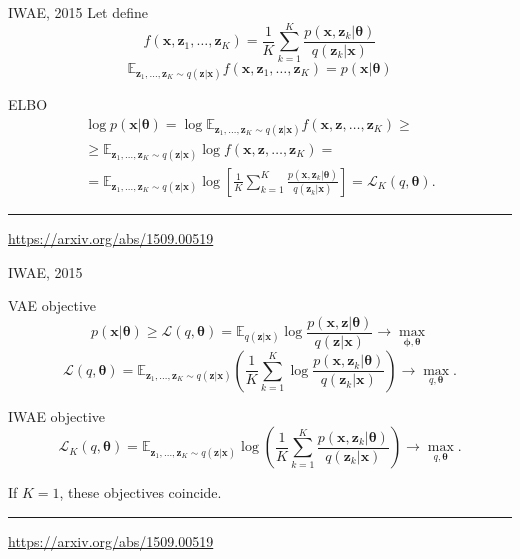 \documentclass{beamer}
\newcommand{\bx}{\mathbf{x}}
\newcommand{\bz}{\mathbf{z}}
\newcommand{\btheta}{\boldsymbol{\theta}}
\newcommand{\bphi}{\boldsymbol{\phi}}
\begin{document}
\begin{frame}{IWAE, 2015}
	Let define
	\[
	f(\bx, \bz_1, \dots, \bz_K) = \frac{1}{K} \sum_{k=1}^K \frac{p(\bx, \bz_k | \btheta)}{q(\bz_k | \bx)}
	\]
	\[
		\mathbb{E}_{\bz_1, \dots, \bz_K \sim q(\bz | \bx)} f(\bx, \bz_1, \dots, \bz_K) = p(\bx | \btheta)
	\]
	\vspace{-0.3cm}
	\begin{block}{ELBO}
		\vspace{-0.5cm}
		\begin{multline*}
			\log p(\bx | \btheta) = \log \mathbb{E}_{\bz_1, \dots, \bz_K \sim q(\bz | \bx)} f(\bx, \bz, \dots, \bz_K) \geq \\
			\geq \mathbb{E}_{\bz_1, \dots, \bz_K \sim q(\bz | \bx)} \log f(\bx, \bz, \dots, \bz_K) = \\
			= \mathbb{E}_{\bz_1, \dots, \bz_K \sim q(\bz | \bx)} \log \left[\frac{1}{K} \sum_{k=1}^K\frac{p(\bx, \bz_k | \btheta)}{q(\bz_k | \bx)} \right] = \mathcal{L}_K(q, \btheta).
		\end{multline*}
	\end{block}
	\vfill
	\hrule\medskip
	{\scriptsize \href{https://arxiv.org/abs/1509.00519}{https://arxiv.org/abs/1509.00519}}
\end{frame}
\begin{frame}{IWAE, 2015}
\begin{block}{VAE objective}
	\vspace{-0.2cm}
	\[
	p(\bx | \btheta) \geq \mathcal{L} (q, \btheta)  = \mathbb{E}_{q(\bz | \bx)} \log \frac{p(\bx, \bz | \btheta)}{q(\bz| \bx)} \rightarrow \max_{\bphi, \btheta}
	\]
	\[
	\mathcal{L} (q, \btheta)  = \mathbb{E}_{\bz_1, \dots, \bz_K \sim q(\bz | \bx)} \left( \frac{1}{K} \sum_{k=1}^K \log \frac{p(\bx, \bz_k | \btheta)}{q(\bz_k| \bx)} \right) \rightarrow \max_{q, \btheta}.
	\]
	\vspace{-0.2cm}
\end{block}
\begin{block}{IWAE objective}
	\vspace{-0.2cm}
	\[
	\mathcal{L}_K (q, \btheta)  = \mathbb{E}_{\bz_1, \dots, \bz_K \sim q(\bz | \bx)} \log \left( \frac{1}{K}\sum_{k=1}^K\frac{p(\bx, \bz_k | \btheta)}{q(\bz_k| \bx)} \right) \rightarrow \max_{q, \btheta}.
	\]
\end{block}
If $K=1$, these objectives coincide.

\vfill
\hrule\medskip
{\scriptsize \href{https://arxiv.org/abs/1509.00519}{https://arxiv.org/abs/1509.00519}}
\end{frame}
\end{document}
